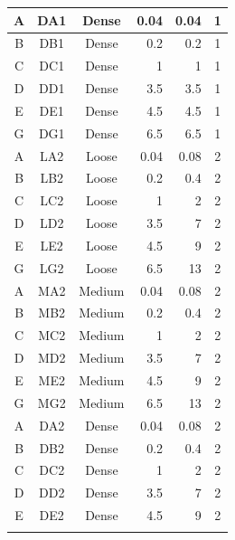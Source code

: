 \documentclass[a4paper, nobind]{templates/ociamthesis}
\begin{document}
\begin{longtable}[c]{@{}|c|c|c|r|r|c|@{}}
\rowcolor[HTML]{BF9000} 
A & DA1 & Dense  & 0.04 & 0.04 & 1 \\* \midrule
\rowcolor[HTML]{BF9000} 
B & DB1 & Dense  & 0.2  & 0.2  & 1 \\* \midrule
\rowcolor[HTML]{BF9000} 
C & DC1 & Dense  & 1    & 1    & 1 \\* \midrule
\rowcolor[HTML]{BF9000} 
D & DD1 & Dense  & 3.5  & 3.5  & 1 \\* \midrule
\rowcolor[HTML]{BF9000} 
E & DE1 & Dense  & 4.5  & 4.5  & 1 \\* \midrule
\rowcolor[HTML]{BF9000} 
G & DG1 & Dense  & 6.5  & 6.5  & 1 \\* \midrule
\rowcolor[HTML]{FFF2CC} 
A & LA2 & Loose  & 0.04 & 0.08 & 2 \\* \midrule
\rowcolor[HTML]{FFF2CC} 
B & LB2 & Loose  & 0.2  & 0.4  & 2 \\* \midrule
\rowcolor[HTML]{FFF2CC} 
C & LC2 & Loose  & 1    & 2    & 2 \\* \midrule
\rowcolor[HTML]{FFF2CC} 
D & LD2 & Loose  & 3.5  & 7    & 2 \\* \midrule
\rowcolor[HTML]{FFF2CC} 
E & LE2 & Loose  & 4.5  & 9    & 2 \\* \midrule
\rowcolor[HTML]{FFF2CC} 
G & LG2 & Loose  & 6.5  & 13   & 2 \\* \midrule
\rowcolor[HTML]{FFD966} 
A & MA2 & Medium & 0.04 & 0.08 & 2 \\* \midrule
\rowcolor[HTML]{FFD966} 
B & MB2 & Medium & 0.2  & 0.4  & 2 \\* \midrule
\rowcolor[HTML]{FFD966} 
C & MC2 & Medium & 1    & 2    & 2 \\* \midrule
\rowcolor[HTML]{FFD966} 
D & MD2 & Medium & 3.5  & 7    & 2 \\* \midrule
\rowcolor[HTML]{FFD966} 
E & ME2 & Medium & 4.5  & 9    & 2 \\* \midrule
\rowcolor[HTML]{FFD966} 
G & MG2 & Medium & 6.5  & 13   & 2 \\* \midrule
\rowcolor[HTML]{BF9000} 
A & DA2 & Dense  & 0.04 & 0.08 & 2 \\* \midrule
\rowcolor[HTML]{BF9000} 
B & DB2 & Dense  & 0.2  & 0.4  & 2 \\* \midrule
\rowcolor[HTML]{BF9000} 
C & DC2 & Dense  & 1    & 2    & 2 \\* \midrule
\rowcolor[HTML]{BF9000} 
D & DD2 & Dense  & 3.5  & 7    & 2 \\* \midrule
\rowcolor[HTML]{BF9000} 
E & DE2 & Dense  & 4.5  & 9    & 2 \\* \midrule
\rowcolor[HTML]{BF9000} 

\end{longtable}
\end{document}
